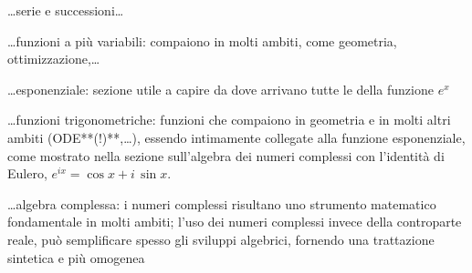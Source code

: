 \documentclass[letterpaper,10pt,italian]{jupyterBook}
\begin{document}
\sphinxAtStartPar
…serie e successioni…

\sphinxAtStartPar
…funzioni a più variabili: compaiono in molti ambiti, come geometria, ottimizzazione,…

\sphinxAtStartPar
…esponenziale: sezione utile a capire da dove arrivano tutte le  della funzione \(e^x\)

\sphinxAtStartPar
…funzioni trigonometriche: funzioni che compaiono in geometria e in molti altri ambiti (ODE**(!)**,…), essendo intimamente collegate alla funzione esponenziale, come mostrato nella sezione sull’algebra dei numeri complessi con l’identità di Eulero, \(e^{i x} = \cos x + i \, \sin x\).

\sphinxAtStartPar
…algebra complessa: i numeri complessi risultano uno strumento matematico fondamentale in molti ambiti; l’uso dei numeri complessi invece della controparte reale, può semplificare spesso gli sviluppi algebrici, fornendo una trattazione sintetica e più omogenea

\sphinxAtStartPar
{}

\sphinxstepscope
\end{document}
